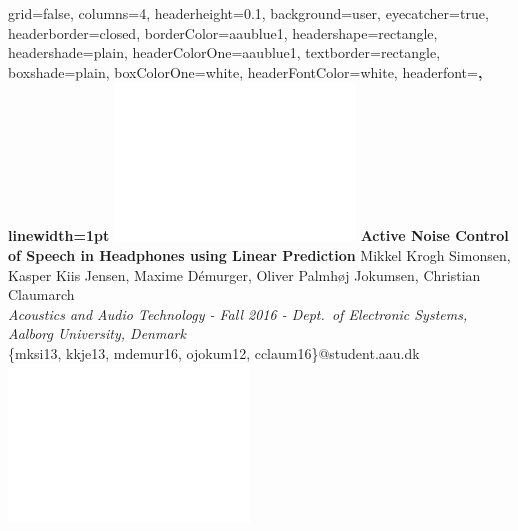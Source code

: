 \documentclass[a0paper,landscape]{baposter}
\begin{document}
\begin{poster}{
  grid=false,
  columns=4,
  headerheight=0.1\textheight,
  background=user,
  eyecatcher=true,
  headerborder=closed,
  borderColor=aaublue1,
  headershape=rectangle,
  headershade=plain,
  headerColorOne=aaublue1,
  textborder=rectangle,
  boxshade=plain,
  boxColorOne=white,
  headerFontColor=white,
  headerfont=\Large\sf\bf,
  linewidth=1pt
}
{
  \includegraphics[height=0.75\headerheight]{aau_logo_new_neg}
}
{\color{white}\bf
  Active Noise Control of Speech in Headphones using Linear Prediction
}
{\color{white}\small 
	\vspace{-3mm}Mikkel Krogh Simonsen, Kasper Kiis Jensen, Maxime Démurger, Oliver Palmhøj Jokumsen, Christian Claumarch\\
  \textit{Acoustics and Audio Technology - Fall 2016 - Dept.\ of Electronic Systems, Aalborg University, Denmark}\\
  \{mksi13, kkje13, mdemur16, ojokum12, cclaum16\}@student.aau.dk
}
{
  \includegraphics[height=0.75\headerheight]{aau_logo_new_neg}
}



\end{poster}
\end{document}
